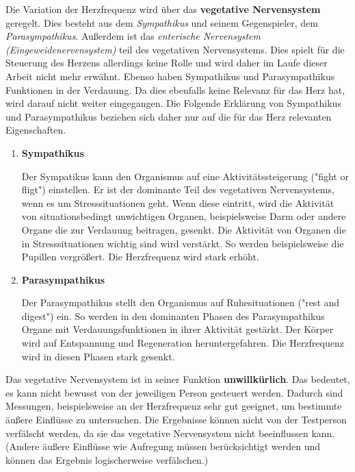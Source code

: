 Die Variation der Herzfrequenz wird über das \textbf{vegetative Nervensystem} geregelt. Dies besteht aus dem \textit{Sympathikus} und seinem Gegenspieler, dem \textit{Parasympathikus}. Außerdem ist das \textit{enterische Nervensystem (Eingeweidenervensystem)} teil des vegetativen Nervensystems. Dies spielt für die Steuerung des Herzens allerdings keine Rolle und wird daher im Laufe dieser Arbeit nicht mehr erwähnt. Ebenso haben Sympathikus und Parasympathikus Funktionen in der Verdauung. Da dies ebenfalls keine Relevanz für das Herz hat, wird darauf nicht weiter eingegangen. Die Folgende Erklärung von Sympathikus und Parasympathikus beziehen sich daher nur auf die für das Herz relevanten Eigenschaften.

\begin{enumerate}
	\item \textbf{Sympathikus} 
	
	Der Sympatikus kann den Organismus auf eine Aktivitätssteigerung ("fight or fligt") einstellen. Er ist der dominante Teil des vegetativen Nervensystems, wenn es um Stresssituationen geht. Wenn diese eintritt, wird die Aktivität von situationsbedingt unwichtigen Organen, beispielsweise Darm oder andere Organe die zur Verdauung beitragen, gesenkt. 
	Die Aktivität von Organen die in Stresssituationen wichtig sind wird verstärkt. So werden beispielsweise die Pupillen vergrößert.
	\color{red}Die Herzfrequenz wird stark erhöht.\color{black}
	
	\item \textbf{Parasympathikus}
	
	Der Parasympathikus stellt den Organismus auf Ruhesituationen ("rest and digest") ein. So werden in den dominanten Phasen des Parasympathikus Organe mit Verdauungsfunktionen in ihrer Aktivität gestärkt. Der Körper wird auf Entspannung und Regeneration heruntergefahren. 
	\color{red}Die Herzfrequenz wird in diesen Phasen stark gesenkt.\color{black}
\end{enumerate}

Das vegetative Nervensystem ist in seiner Funktion \textbf{unwillkürlich}. Das bedeutet, es kann nicht bewusst von der jeweiligen Person gesteuert werden. Dadurch sind Messungen, beispielsweise an der Herzfrequenz sehr gut geeignet, um bestimmte äußere Einflüsse zu untersuchen.
Die Ergebnisse können nicht von der Testperson verfälscht werden, da sie das vegetative Nervensystem nicht beeinflussen kann. (Andere äußere Einflüsse wie Aufregung müssen berücksichtigt werden und können das Ergebnis logischerweise verfälschen.)
		
